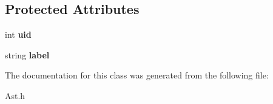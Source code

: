 \subsection*{Protected Attributes}
\begin{DoxyCompactItemize}
\item 
\hypertarget{classAST_a847b778f1c3dd5a19de32de432ee6e15}{int {\bfseries uid}}\label{classAST_a847b778f1c3dd5a19de32de432ee6e15}

\item 
\hypertarget{classAST_ab2e239ccc0688d2341724432ff5a1a31}{string {\bfseries label}}\label{classAST_ab2e239ccc0688d2341724432ff5a1a31}

\end{DoxyCompactItemize}


The documentation for this class was generated from the following file\-:\begin{DoxyCompactItemize}
\item 
Ast.\-h\end{DoxyCompactItemize}
